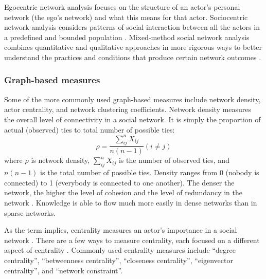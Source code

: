 Egocentric network analysis focuses on the structure of an actor's personal network (the ego's network) and what this means for that actor. Sociocentric network analysis considers patterns of social interaction between all the actors in a predefined and bounded population \citep{kilduff2003social,provan2007interorganizational}. Mixed\hyp{}method social network analysis combines quantitative and qualitative approaches in more rigorous ways to better understand the practices and conditions that produce certain network outcomes \citep{dominguez2014mixed}. \medskip

\subsubsection{Graph\hyp{}based measures}

Some of the more commonly used graph\hyp{}based measures include network density, actor centrality, and network clustering coefficients. Network density measures the overall level of connectivity in a social network. It is simply the proportion of actual (observed) ties to total number of possible ties:  $$\rho = \frac{\sum_{ij}^{n}X_{ij}}{n(n-1)}(i \neq j)$$ where $\rho$ is network density, $\sum_{ij}^{n}X_{ij}$ is the number of observed ties, and $n(n-1)$ is the total number of possible ties. Density ranges from 0 (nobody is connected) to 1 (everybody is connected to one another). The denser the network, the higher the level of cohesion and the level of redundancy in the network \citep{newman2010networks}. Knowledge is able to flow much more easily in dense networks than in sparse networks. \medskip

As the term implies, centrality measures an actor's importance in a social network \citep{borgatti2013analyzing}. There are a few ways to measure centrality, each focused on a different aspect of centrality \citep{freeman1979centrality}. Commonly used centrality measures include \enquote{degree centrality}, \enquote{betweenness centrality}, \enquote{closeness centrality}, \enquote{eigenvector centrality}, and \enquote{network constraint}. \medskip

